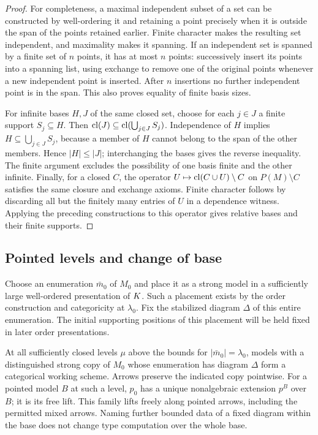 \begin{proof}
For completeness, a maximal independent subset of a set can be
constructed by well-ordering it and retaining a point precisely when
it is outside the span of the points retained earlier.  Finite
character makes the resulting set independent, and maximality makes
it spanning.  If an independent set is spanned by a finite set of
$n$ points, it has at most $n$ points: successively insert its points
into a spanning list, using exchange to remove one of the original
points whenever a new independent point is inserted.  After $n$
insertions no further independent point is in the span.  This also
proves equality of finite basis sizes.

For infinite bases $H,J$ of the same closed set, choose for each
$j\in J$ a finite support $S_j\subseteq H$.  Then
$\operatorname{cl}(J)\subseteq\operatorname{cl}(\bigcup_{j\in J}S_j)$.  Independence of $H$
implies $H\subseteq\bigcup_{j\in J}S_j$, because a member of $H$
cannot belong to the span of the other members.  Hence
$|H|\leq|J|$; interchanging the bases gives the reverse inequality.
The finite argument excludes the possibility of one basis finite
and the other infinite.  Finally, for a closed $C$, the operator
$U\mapsto\operatorname{cl}(C\cup U)\setminus C$ on $P(M)\setminus C$ satisfies
the same closure and exchange axioms.  Finite character follows by
discarding all but the finitely many entries of $U$ in a dependence
witness.  Applying the preceding constructions to this operator
gives relative bases and their finite supports.
\end{proof}

\subsection{Pointed levels and change of base}

Choose an enumeration $\bar m_0$ of $M_0$ and place it as a strong
model in a sufficiently large well-ordered presentation of $K$.
Such a placement exists by the order construction and categoricity at
$\lambda_0$.  Fix the stabilized diagram $\Delta$ of this entire
enumeration.  The initial supporting positions of this placement will
be held fixed in later order presentations.

\begin{proposition}
\label{geom:pointed-levels}
At all sufficiently closed levels $\mu$ above the bounds for
$|\bar m_0|=\lambda_0$, models with a distinguished strong copy of
$M_0$ whose enumeration has diagram $\Delta$ form a categorical
working scheme.  Arrows preserve the indicated copy pointwise.
For a pointed model $B$ at such a level, $p_0$ has a unique
nonalgebraic extension $p^B$ over $B$; it is its free lift.  This family
lifts freely along pointed arrows, including the permitted mixed
arrows.  Naming further bounded data of a fixed diagram within the
base does not change type computation over the whole base.
\end{proposition}

